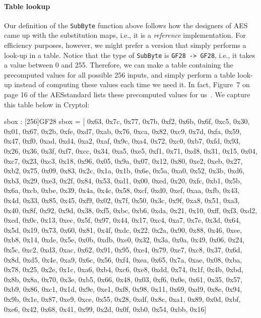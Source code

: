 \paragraph*{Table lookup} Our definition of the {\tt SubByte} function
above follows how the designers of AES came up with the substitution
maps, i.e., it is a {\em reference} implementation. For efficiency
purposes, however, we might prefer a version that simply performs a
look-up in a table. Notice that the type of {\tt SubByte} is {\tt GF28
  -> GF28}, i.e., it takes a value between 0 and 255. Therefore, we
can make a table containing the precomputed values for all possible
256 inputs, and simply perform a table look-up instead of computing
these values each time we need it.  In fact, Figure~7 on page 16 of
the AES\indAES standard lists these precomputed values for
us~\cite[Section 5.1.1]{aes}. We capture this table below in Cryptol:
\vspace{0.25cm}
\begin{minipage}{\textwidth}
{\footnotesize
\begin{code}
  sbox : [256]GF28
  sbox = [
     0x63, 0x7c, 0x77, 0x7b, 0xf2, 0x6b, 0x6f, 0xc5, 0x30, 0x01, 0x67,
     0x2b, 0xfe, 0xd7, 0xab, 0x76, 0xca, 0x82, 0xc9, 0x7d, 0xfa, 0x59,
     0x47, 0xf0, 0xad, 0xd4, 0xa2, 0xaf, 0x9c, 0xa4, 0x72, 0xc0, 0xb7,
     0xfd, 0x93, 0x26, 0x36, 0x3f, 0xf7, 0xcc, 0x34, 0xa5, 0xe5, 0xf1,
     0x71, 0xd8, 0x31, 0x15, 0x04, 0xc7, 0x23, 0xc3, 0x18, 0x96, 0x05,
     0x9a, 0x07, 0x12, 0x80, 0xe2, 0xeb, 0x27, 0xb2, 0x75, 0x09, 0x83,
     0x2c, 0x1a, 0x1b, 0x6e, 0x5a, 0xa0, 0x52, 0x3b, 0xd6, 0xb3, 0x29,
     0xe3, 0x2f, 0x84, 0x53, 0xd1, 0x00, 0xed, 0x20, 0xfc, 0xb1, 0x5b,
     0x6a, 0xcb, 0xbe, 0x39, 0x4a, 0x4c, 0x58, 0xcf, 0xd0, 0xef, 0xaa,
     0xfb, 0x43, 0x4d, 0x33, 0x85, 0x45, 0xf9, 0x02, 0x7f, 0x50, 0x3c,
     0x9f, 0xa8, 0x51, 0xa3, 0x40, 0x8f, 0x92, 0x9d, 0x38, 0xf5, 0xbc,
     0xb6, 0xda, 0x21, 0x10, 0xff, 0xf3, 0xd2, 0xcd, 0x0c, 0x13, 0xec,
     0x5f, 0x97, 0x44, 0x17, 0xc4, 0xa7, 0x7e, 0x3d, 0x64, 0x5d, 0x19,
     0x73, 0x60, 0x81, 0x4f, 0xdc, 0x22, 0x2a, 0x90, 0x88, 0x46, 0xee,
     0xb8, 0x14, 0xde, 0x5e, 0x0b, 0xdb, 0xe0, 0x32, 0x3a, 0x0a, 0x49,
     0x06, 0x24, 0x5c, 0xc2, 0xd3, 0xac, 0x62, 0x91, 0x95, 0xe4, 0x79,
     0xe7, 0xc8, 0x37, 0x6d, 0x8d, 0xd5, 0x4e, 0xa9, 0x6c, 0x56, 0xf4,
     0xea, 0x65, 0x7a, 0xae, 0x08, 0xba, 0x78, 0x25, 0x2e, 0x1c, 0xa6,
     0xb4, 0xc6, 0xe8, 0xdd, 0x74, 0x1f, 0x4b, 0xbd, 0x8b, 0x8a, 0x70,
     0x3e, 0xb5, 0x66, 0x48, 0x03, 0xf6, 0x0e, 0x61, 0x35, 0x57, 0xb9,
     0x86, 0xc1, 0x1d, 0x9e, 0xe1, 0xf8, 0x98, 0x11, 0x69, 0xd9, 0x8e,
     0x94, 0x9b, 0x1e, 0x87, 0xe9, 0xce, 0x55, 0x28, 0xdf, 0x8c, 0xa1,
     0x89, 0x0d, 0xbf, 0xe6, 0x42, 0x68, 0x41, 0x99, 0x2d, 0x0f, 0xb0,
     0x54, 0xbb, 0x16]
\end{code}
}
\end{minipage}

